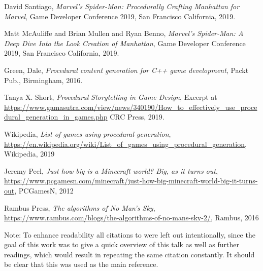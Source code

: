 \documentclass[a4paper]{article}
\begin{document}
\begin{thebibliography}{1}

David Santiago,
\emph{Marvel's Spider-Man: Procedurally Crafting Manhattan for Marvel},
Game Developer Conference 2019, San Francisco California,
2019.

Matt McAuliffe and Brian Mullen and Ryan Benno,
\emph{Marvel's Spider-Man: A Deep Dive Into the Look Creation of Manhattan},
Game Developer Conference 2019, San Francisco California,
2019.

Green, Dale,
\emph{Procedural content generation for C++ game development},
Packt Pub., Birmingham, 2016.

Tanya X. Short,
\emph{Procedural Storytelling in Game Design},
Excerpt at \url{https://www.gamasutra.com/view/news/340190/How_to_effectively_use_procedural_generation_in_games.php}
CRC Press, 2019.


Wikipedia,
\emph{List of games using procedural generation},
\url{https://en.wikipedia.org/wiki/List_of_games_using_procedural_generation}, Wikipedia, 2019

Jeremy Peel,
\emph{Just how big is a Minecraft world? Big, as it turns out},
\url{https://www.pcgamesn.com/minecraft/just-how-big-minecraft-world-big-it-turns-out}, PCGamesN, 2012

Rambus Press,
\emph{The algorithms of No Man’s Sky},
\url{https://www.rambus.com/blogs/the-algorithms-of-no-mans-sky-2/}, Rambus, 2016



\end{thebibliography}

Note: To enhance readability all citations to \cite{gdc2019} were left out intentionally, since the goal of this work was to give a quick overview of this talk as well as further readings, which would result in repeating the same citation constantly. It should be clear that this was used as the main reference.
\end{document}
